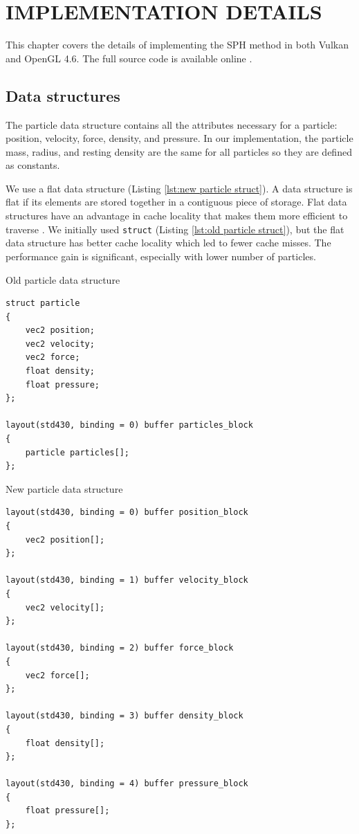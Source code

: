 \documentclass[a4paper, 12pt, oneside]{book}
\newenvironment{longlisting}{\captionsetup{type=listing}}{}
\begin{document}
\chapter{IMPLEMENTATION DETAILS}
\label{ch:implementation details}

\begin{doublespace}
    This chapter covers the details of implementing the SPH method in both Vulkan and OpenGL 4.6. The full source code is available online \cite{web:sph_vulkan, web:sph_opengl, web:undergraduate_thesis}.
\end{doublespace}

\section{Data structures}

\begin{doublespace}
The particle data structure contains all the attributes necessary for a particle: position, velocity, force, density, and pressure. In our implementation, the particle mass, radius, and resting density are the same for all particles so they are defined as constants.

We use a flat data structure (Listing \ref{lst:new particle struct}). A data structure is flat if its elements are stored together in a contiguous piece of storage. Flat data structures have an advantage in cache locality that makes them more efficient to traverse \cite[145]{guntheroth2016}. We initially used \texttt{struct} (Listing \ref{lst:old particle struct}), but the flat data structure has better cache locality which led to fewer cache misses. The performance gain is significant, especially with lower number of particles.
\end{doublespace}

\begin{longlisting}
\caption{Old particle data structure}
\label{lst:old particle struct}
\begin{verbatim}
struct particle
{
    vec2 position;
    vec2 velocity;
    vec2 force;
    float density;
    float pressure;
};

layout(std430, binding = 0) buffer particles_block
{
    particle particles[];
};
\end{verbatim}
\end{longlisting}

\begin{longlisting}
\caption{New particle data structure}
\label{lst:new particle struct}
\begin{verbatim}
layout(std430, binding = 0) buffer position_block
{
    vec2 position[];
};

layout(std430, binding = 1) buffer velocity_block
{
    vec2 velocity[];
};

layout(std430, binding = 2) buffer force_block
{
    vec2 force[];
};

layout(std430, binding = 3) buffer density_block
{
    float density[];
};

layout(std430, binding = 4) buffer pressure_block
{
    float pressure[];
};
\end{verbatim}
\end{longlisting}
\end{document}
